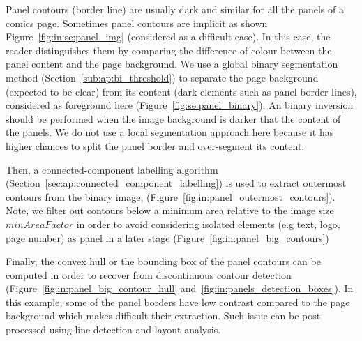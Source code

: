 
Panel contours (border line) are usually dark and similar for all the panels of a comics page.
Sometimes panel contours are implicit as shown Figure~\ref{fig:in:se:panel_img} (considered as a difficult case).
In this case, the reader distinguishes them by comparing the difference of colour between the panel content and the page background.
We use a global binary segmentation method (Section~\ref{sub:ap:bi_threshold}) to separate the page background (expected to be clear) from its content (dark elements such as panel border lines), considered as foreground here (Figure~\ref{fig:se:panel_binary}).
An binary inversion should be performed when the image background is darker that the content of the panels.
We do not use a local segmentation approach here because it has higher chances to split the panel border and over-segment its content.

Then, a connected-component labelling algorithm (Section~\ref{sec:ap:connected_component_labelling}) is used to extract outermost contours from the binary image, (Figure~\ref{fig:in:panel_outermost_contours}).
Note, we filter out contours below a minimum area relative to the image size $minAreaFactor$ in order to avoid considering isolated elements (e.g text, logo, page number) as panel in a later stage (Figure~\ref{fig:in:panel_big_contours})

Finally, the convex hull or the bounding box of the panel contours can be computed in order to recover from discontinuous contour detection (Figure~\ref{fig:in:panel_big_contour_hull} and~\ref{fig:in:panels_detection_boxes}).
In this example, some of the panel borders have low contrast compared to the page background which makes difficult their extraction.
Such issue can be post processed using line detection and layout analysis.

